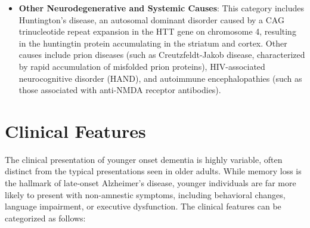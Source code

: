 \begin{itemize}
    \item \textbf{Other Neurodegenerative and Systemic Causes}: This category includes Huntington's disease, an autosomal dominant disorder caused by a CAG trinucleotide repeat expansion in the HTT gene on chromosome 4, resulting in the huntingtin protein accumulating in the striatum and cortex. Other causes include prion diseases (such as Creutzfeldt-Jakob disease, characterized by rapid accumulation of misfolded prion proteins), HIV-associated neurocognitive disorder (HAND), and autoimmune encephalopathies (such as those associated with anti-NMDA receptor antibodies).
\end{itemize}

\section*{Clinical Features}
The clinical presentation of younger onset dementia is highly variable, often distinct from the typical presentations seen in older adults. While memory loss is the hallmark of late-onset Alzheimer's disease, younger individuals are far more likely to present with non-amnestic symptoms, including behavioral changes, language impairment, or executive dysfunction. The clinical features can be categorized as follows:

